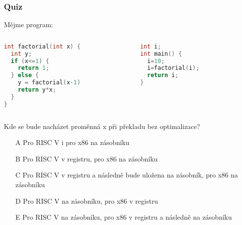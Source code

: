 \documentclass{beamer}
\begin{document}
\begin{frame}[fragile,shrink=10]
\frametitle{Quiz}

Mějme program:
\begin{columns}
\begin{column}{0.45\textwidth}
\begin{lstlisting}[language={C},columns=flexible]
int factorial(int x) {
  int y;
  if (x<=1) {
    return 1;
  } else {
    y = factorial(x-1)
    return y*x;
  }
}
\end{lstlisting}
\end{column}
\hfill
\begin{column}{0.45\textwidth}  
\begin{lstlisting}[language={C},columns=flexible]
int i;
int main() {
  i=10;
  i=factorial(i);
  return i;
}
\end{lstlisting}
\end{column}
\end{columns}

Kde se bude nacházet proměnná x při překladu bez optimalizace?
\begin{itemize}
\item[A] Pro RISC V i pro x86 na zásobníku
\item[B] Pro RISC V v registru, pro x86 na zásobníku
\item[C] Pro RISC V v registru a následně bude uložena na zásobník, pro x86 na zásobníku
\item[D] Pro RISC V na zásobníku, pro x86 v registru
\item[E] Pro RISC V na zásobníku, pro x86 v registru a následně na zásobníku
\end{itemize}
\end{frame}
\end{document}
